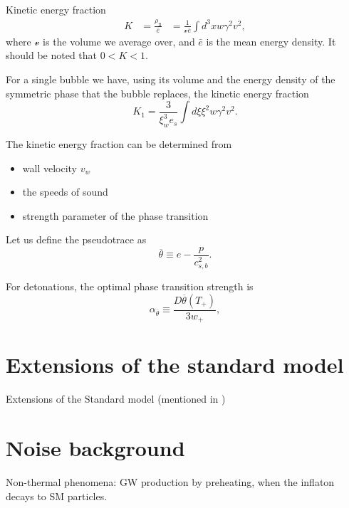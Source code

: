 Kinetic energy fraction
\cites[eq. 7.36]{lecture_notes}[eq. 5]{giese_2020}
\begin{align}
K
&= \frac{\rho_\text{fl}}{\bar{e}}
&= \frac{1}{\mathcal{v} \bar{e}} \int d^3 x w \gamma^2 v^2,
\end{align}
where $\mathcal{v}$ is the volume we average over, and $\bar{e}$ is the mean energy density.
It should be noted that $0 < K < 1$.
\cite{giese_2020}

For a single bubble we have, using its volume and the energy density of the symmetric phase that the bubble replaces, the kinetic energy fraction
\cites[eq. 7.37]{lecture_notes}[eq. 5]{giese_2020}
\begin{equation}
K_1 = \frac{3}{\xi_w^3 e_s} \int d\xi \xi^2 w \gamma^2 v^2.
\end{equation}

The kinetic energy fraction can be determined from
\begin{itemize}
\item wall velocity $v_w$
\item the speeds of sound
\item strength parameter of the phase transition
\end{itemize}

Let us define the pseudotrace as
\cites[eq. 34]{giese_2020}[eq. 1]{giese_2021}
\begin{equation}
\overline{\theta} \equiv e - \frac{p}{c_{s,b}^2}.
\end{equation}

For detonations, the optimal phase transition strength is
\cites[eq. 34]{giese_2020}[eq. 1]{giese_2021}
\begin{equation}
\alpha_{\overline{\theta}} \equiv \frac{D \overline{\theta}(T_+)}{3w_+},
\end{equation}


\section{Extensions of the standard model}
Extensions of the Standard model \cite{caprini_detecting_2020}
(mentioned in \cite[p. 14]{lecture_notes})

\section{Noise background}
Non-thermal phenomena: GW production by preheating, when the inflaton decays to SM particles.
\cite{lecture_notes}
